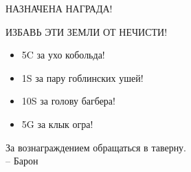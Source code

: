 \documentclass[a4paper,11pt]{book}
\begin{document}
\begin{multicols}{2}
\clearpage

\begin{framed}
НАЗНАЧЕНА НАГРАДА!

ИЗБАВЬ ЭТИ ЗЕМЛИ ОТ НЕЧИСТИ!
\begin{itemize}
  \item 5C за ухо кобольда!
  \item 1S за пару гоблинских ушей!
  \item 10S за голову багбера!
  \item 5G за клык огра!
\end{itemize}
За вознаграждением обращаться в таверну. \\
-- Барон
\end{framed}




\end{multicols}
\end{document}
